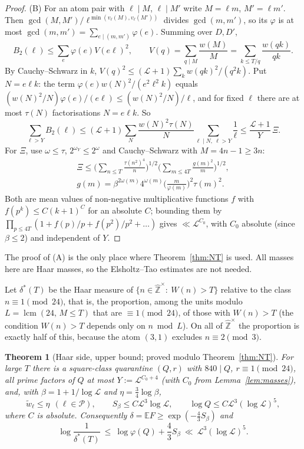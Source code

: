 \documentclass[11pt,reqno]{amsart}
\newtheorem{theorem}{Theorem}[section]
\theoremstyle{definition}
\newcommand{\lcm}{\operatorname{lcm}}
\newcommand{\cP}{\mathcal P}
\newcommand{\Lc}{\mathcal L}
\newcommand{\E}{\mathbb E}
\begin{document}
\begin{proof}
(B) For an atom pair with $\ell\mid M$, $\ell\mid M'$ write $M=\ell m$,
$M'=\ell m'$.  Then $\gcd(M,M')/\ell^{\min(v_\ell(M),v_\ell(M'))}$ divides $\gcd(m,m')$, so
its $\varphi$ is at most $\gcd(m,m')=\sum_{e\mid(m,m')}\varphi(e)$.  Summing over
$D,D'$,
\[
 B_2(\ell)\le\sum_e\varphi(e)V(e\ell)^2,\qquad V(q)=\sum_{q\mid M}\frac{w(M)}M=\sum_{k\le T/q}\frac{w(qk)}{qk}.
\]
By Cauchy--Schwarz in $k$, $V(q)^2\le(\Lc+1)\sum_kw(qk)^2/(q^2k)$.  Put $N=e\ell k$:
the term $\varphi(e)w(N)^2/(e^2\ell^2k)$ equals $(w(N)^2/N)\varphi(e)/(e\ell)\le(w(N)^2/N)/\ell$,
and for fixed $\ell$ there are at most $\tau(N)$ factorisations $N=e\ell k$.  So
\[
 \sum_{\ell>Y}B_2(\ell)\le(\Lc+1)\sum_N\frac{w(N)^2\tau(N)}N\sum_{\ell\mid N,\ \ell>Y}\frac1\ell\le\frac{\Lc+1}Y\,\Xi .
\]
For $\Xi$, use $\omega\le\tau$, $2^{\omega_Y}\le2^\omega$ and Cauchy--Schwarz with
$M=4n-1\ge3n$:
\begin{multline*}
 \Xi\le\Big(\sum_{n\le T}\frac{\tau(n^2)^4}n\Big)^{1/2}\Big(\sum_{m\le4T}\frac{g(m)^2}m\Big)^{1/2},\\
 g(m)=\beta^{2\omega(m)}4^{\omega(m)}\Big(\frac m{\varphi(m)}\Big)^2\tau(m)^2 .
\end{multline*}
Both are mean values of non-negative multiplicative functions $f$ with
$f(p^k)\le C(k+1)^C$ for an absolute $C$; bounding them by
$\prod_{p\le4T}(1+f(p)/p+f(p^2)/p^2+\dots)$ gives $\ll\Lc^{C_0}$, with
$C_0$ absolute (since $\beta\le2$) and independent of $Y$.
\end{proof}

The proof of (A) is the only place where Theorem~\ref{thm:NT} is used.  All
masses here are Haar masses, so the Elsholtz--Tao estimates are not needed.

Let $\delta^*(T)$ be the Haar measure of $\{n\in\hat{\mathbb Z}^\times:\ W(n)>T\}$
relative to the class $n\equiv1\pmod{24}$, that is, the proportion, among the
units modulo $L=\lcm(24,\,M\le T)$ that are $\equiv1\pmod{24}$, of those with
$W(n)>T$ (the condition $W(n)>T$ depends only on $n\bmod L$).  On all of
$\hat{\mathbb Z}^\times$ the proportion is exactly half of this, because the atom
$(3,1)$ excludes $n\equiv2\pmod3$.

\begin{theorem}[Haar side, upper bound; proved modulo Theorem~\ref{thm:NT}]\label{thm:haarupper}
For large $T$ there is a square-class quarantine $(Q,r)$ with $840\mid Q$,
$r\equiv1\pmod{24}$, all prime factors of $Q$ at most $Y:=\Lc^{C_0+4}$ (with
$C_0$ from Lemma~\ref{lem:masses}), and, with $\beta=1+1/\log\Lc$ and
$\eta=\frac34\log\beta$,
\begin{equation}\label{eq:goodQ}
 \tilde w_\ell\le\eta\ \ (\ell\in\cP),\qquad S_\beta\le C\Lc^3\log\Lc,\qquad \log Q\le C\Lc^3(\log\Lc)^5,
\end{equation}
where $C$ is absolute.  Consequently $\delta=\E F\ge\exp(-\frac43S_\beta)$ and
\[
 \log\frac1{\delta^*(T)}\ \le\ \log\varphi(Q)+\frac43S_\beta\ \ll\ \Lc^3(\log\Lc)^5 .
\]
\end{theorem}
\end{document}
